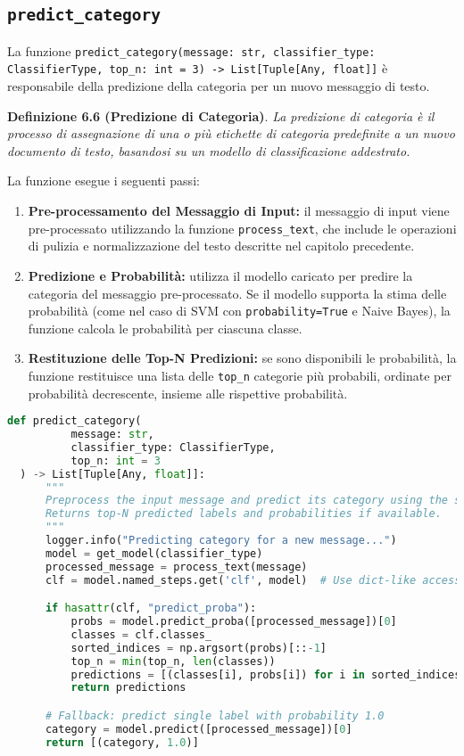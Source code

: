  \subsection{\texttt{predict\_category}}

 La funzione \texttt{predict\_category(message: str, classifier\_type: ClassifierType, top\_n: int = 3) -> List[Tuple[Any, float]]} è responsabile della predizione della categoria per un nuovo messaggio di testo. \newline

 \textbf{Definizione 6.6 (Predizione di Categoria)}. \textit{La predizione di categoria è il processo di assegnazione di una o più etichette di categoria predefinite a un nuovo documento di testo, basandosi su un modello di classificazione addestrato.}\newline

 La funzione esegue i seguenti passi:
 \begin{enumerate}
     \item \textbf{Pre-processamento del Messaggio di Input:} il messaggio di input viene pre-processato utilizzando la funzione \texttt{process\_text}, che include le operazioni di pulizia e normalizzazione del testo descritte nel capitolo precedente.
     \item \textbf{Predizione e Probabilità:} utilizza il modello caricato per predire la categoria del messaggio pre-processato. Se il modello supporta la stima delle probabilità (come nel caso di SVM con \texttt{probability=True} e Naive Bayes), la funzione calcola le probabilità per ciascuna classe.
     \item \textbf{Restituzione delle Top-N Predizioni:} se sono disponibili le probabilità, la funzione restituisce una lista delle \texttt{top\_n} categorie più probabili, ordinate per probabilità decrescente, insieme alle rispettive probabilità.
 \end{enumerate}
\newpage
 \begin{lstlisting}[language=Python,caption={Funzione predict\_category}]
  def predict_category(
          message: str,
          classifier_type: ClassifierType,
          top_n: int = 3
  ) -> List[Tuple[Any, float]]:
      """
      Preprocess the input message and predict its category using the specified classifier.
      Returns top-N predicted labels and probabilities if available.
      """
      logger.info("Predicting category for a new message...")
      model = get_model(classifier_type)
      processed_message = process_text(message)
      clf = model.named_steps.get('clf', model)  # Use dict-like access if available

      if hasattr(clf, "predict_proba"):
          probs = model.predict_proba([processed_message])[0]
          classes = clf.classes_
          sorted_indices = np.argsort(probs)[::-1]
          top_n = min(top_n, len(classes))
          predictions = [(classes[i], probs[i]) for i in sorted_indices[:top_n]]
          return predictions

      # Fallback: predict single label with probability 1.0
      category = model.predict([processed_message])[0]
      return [(category, 1.0)]
 \end{lstlisting}